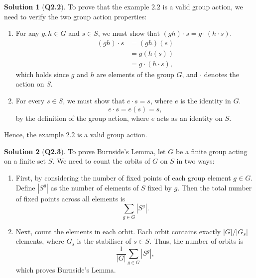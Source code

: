 \documentclass{article}
\theoremstyle{definition}
\newtheorem*{sol}{Solution}
\begin{document}
\begin{sol}[\textbf{Q2.2}]
	To prove that the example $2.2$ is a valid group action, we need to verify the two group action properties:
	\begin{enumerate}
		\item For any $g,h \in G$ and $s \in S$, we must show that $(gh)\cdot s = g\cdot(h\cdot s)$.
		      \begin{align}
			      (gh)\cdot s & = (gh)(s)           \\
			                  & = g(h(s))           \\
			                  & = g\cdot(h\cdot s),
		      \end{align}
		      which holds since $g$ and $h$ are elements of the group $G$, and $\cdot$ denotes the action on $S$.
		\item For every $s \in S$, we must show that $e\cdot s = s$, where $e$ is the identity in $G$.
		      \begin{equation}
			      e\cdot s = e(s) = s,
		      \end{equation}
		      by the definition of the group action, where $e$ acts as an identity on $S$.
	\end{enumerate}
	Hence, the example $2.2$ is a valid group action.
\end{sol}

\begin{sol}[\textbf{Q2.3}]
	To prove Burnside's Lemma, let $G$ be a finite group acting on a finite set $S$. We need to count the orbits of $G$ on $S$ in two ways:
	\begin{enumerate}
		\item First, by considering the number of fixed points of each group element $g \in G$. Define $|S^g|$ as the number of elements of $S$ fixed by $g$. Then the total number of fixed points across all elements is
		      \begin{equation}
			      \sum_{g \in G} |S^g|.
		      \end{equation}
		\item Next, count the elements in each orbit. Each orbit contains exactly $|G|/|G_s|$ elements, where $G_s$ is the stabiliser of $s \in S$. Thus, the number of orbits is
		      \begin{equation}
			      \frac{1}{|G|} \sum_{g \in G} |S^g|,
		      \end{equation}
		      which proves Burnside's Lemma.
	\end{enumerate}
\end{sol}
\end{document}

